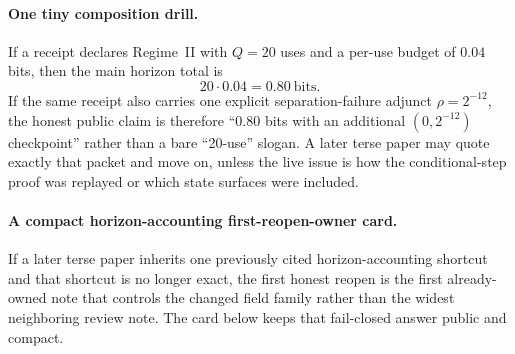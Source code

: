 \documentclass[11pt]{article}
\begin{document}
\paragraph{One tiny composition drill.}
If a receipt declares Regime~II with $Q=20$ uses and a per-use budget of $0.04$ bits, then the main horizon total is
\[
20\cdot 0.04 = 0.80\ \text{bits}.
\]
If the same receipt also carries one explicit separation-failure adjunct $\rho = 2^{-12}$, the honest public claim is therefore ``$0.80$ bits with an additional $(0,2^{-12})$ checkpoint'' rather than a bare ``20-use'' slogan.
A later terse paper may quote exactly that packet and move on, unless the live issue is how the conditional-step proof was replayed or which state surfaces were included.

\paragraph{A compact horizon-accounting first-reopen-owner card.}
If a later terse paper inherits one previously cited horizon-accounting shortcut and that shortcut is no longer exact, the first honest reopen is the first already-owned note that controls the changed field family rather than the widest neighboring review note. The card below keeps that fail-closed answer public and compact.
\end{document}
